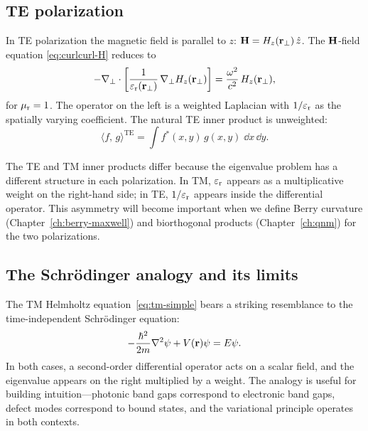 \subsection{TE polarization}
\label{ssec:te}

In TE polarization the magnetic field is parallel to $z$:
$\mathbf{H} = H_z(\mathbf{r}_\perp)\,\hat{z}$. The $\mathbf{H}$-field equation
\eqref{eq:curlcurl-H} reduces to
\begin{equation}
 -\nabla_\perp\cdot
 \left[\frac{1}{\varepsilon_{\mathrm{r}}(\mathbf{r}_\perp)}\,\nabla_\perp H_z(\mathbf{r}_\perp)\right]
 = \frac{\omega^2}{c^2}\,H_z(\mathbf{r}_\perp),
 \label{eq:te-helmholtz}
\end{equation}
for $\mu_{\mathrm{r}} = 1$. The operator on the left is a weighted Laplacian with
$1/\varepsilon_{\mathrm{r}}$ as the spatially varying coefficient. The natural TE inner
product is unweighted:
\begin{equation}
 \langle f,\,g\rangle^{\mathrm{TE}}
 = \int f^*(x,y)\,g(x,y)\;\dd x\,\dd y.
 \label{eq:te-inner}
\end{equation}

\begin{remark}
The TE and TM inner products differ because the eigenvalue problem has a
different structure in each polarization. In TM, $\varepsilon_{\mathrm{r}}$ appears as a
multiplicative weight on the right-hand side; in TE, $1/\varepsilon_{\mathrm{r}}$ appears
inside the differential operator. This asymmetry will become important
when we define Berry curvature (Chapter~\ref{ch:berry-maxwell}) and
biorthogonal products (Chapter~\ref{ch:qnm}) for the two polarizations.
\end{remark}

\subsection{The Schr\"odinger analogy and its limits}
\label{ssec:schrodinger-analogy}

The TM Helmholtz equation~\eqref{eq:tm-simple} bears a striking
resemblance to the time-independent Schr\"odinger equation:
\begin{equation}
 -\frac{\hbar^2}{2m}\nabla^2\psi + V(\mathbf{r})\psi = E\psi.
 \label{eq:schrodinger}
\end{equation}
In both cases, a second-order differential operator acts on a scalar
field, and the eigenvalue appears on the right multiplied by a weight.
The analogy is useful for building intuition---photonic band gaps
correspond to electronic band gaps, defect modes correspond to bound
states, and the variational principle operates in both contexts.

